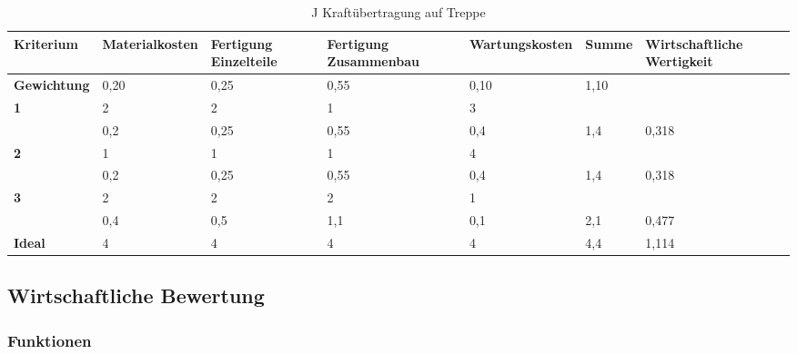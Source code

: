 \documentclass[10pt,a4paper]{article}
\begin{document}
\begin{table}[h!]
    \centering
    \hspace*{0in} %
    \begin{tabular}{>{\bfseries}p{2cm} p{2.2cm} p{2cm} p{2cm} p{2.5cm} p{2cm} p{2cm}}
        \toprule
        Kriterium  & Materialkosten & Fertigung Einzelteile & Fertigung Zusammenbau & Wartungskosten & Summe & Wirtschaftliche Wertigkeit \\
        \midrule
        Gewichtung & 0,20           & 0,25                  & 0,55                  & 0,10           & 1,10  &                            \\
        \midrule
        1          & 2              & 2                     & 1                     & 3              &       &                            \\
                   & 0,2            & 0,25                  & 0,55                  & 0,4            & 1,4   & 0,318                      \\
        \midrule
        2          & 1              & 1                     & 1                     & 4              &       &                            \\
                   & 0,2            & 0,25                  & 0,55                  & 0,4            & 1,4   & 0,318                      \\
        \midrule
        3          & 2              & 2                     & 2                     & 1              &       &                            \\
                   & 0,4            & 0,5                   & 1,1                   & 0,1            & 2,1   & 0,477                      \\
        \midrule
        Ideal      & 4              & 4                     & 4                     & 4              & 4,4   & 1,114                      \\
        \bottomrule
    \end{tabular}
    \caption{J Kraftübertragung auf Treppe}
\end{table}

\FloatBarrier %
\subsection{Wirtschaftliche Bewertung}
\subsubsection{Funktionen}
\end{document}
